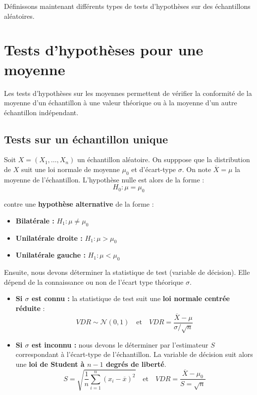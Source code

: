 Définissons maintenant différents types de tests d'hypothèses sur des échantillons aléatoires. 


\section{Tests d'hypothèses pour une moyenne}

Les tests d'hypothèses sur les moyennes permettent de vérifier la conformité de la moyenne d'un échantillon à une 
valeur théorique ou à la moyenne d'un autre échantillon indépendant. 

\subsection{Tests sur un échantillon unique}

Soit $X = (X_1, \dots, X_n)$ un échantillon aléatoire. On supppose que la distribution de $X$ suit une 
loi normale de moyenne $\mu_0$ et d'écart-type $\sigma$. On note $\overline{X} = \mu$ la moyenne de l'échantillon. 
L'hypothèse nulle est alors de la forme : 
    \[ H_0 : \mu = \mu_0 \] 

contre une \textbf{hypothèse alternative} de la forme :
\begin{itemize}
    \item \textbf{Bilatérale :} $H_1 : \mu \not = \mu_0 $ 
    \item \textbf{Unilatérale droite :} $H_1 : \mu > \mu_0 $ 
    \item \textbf{Unilatérale gauche :} $H_1 : \mu < \mu_0 $
\end{itemize}

Ensuite, nous devons déterminer la statistique de test (variable de décision). 
Elle dépend de la connaissance ou non de l'écart type théorique $\sigma$. 
\begin{itemize}
    \item \textbf{Si $\sigma$ est connu :} la statistique de test suit une \textbf{loi normale centrée réduite} :
        \[ VDR \sim \mathcal{N}(0,1) \quad \text{et} \quad VDR = \frac{\overline{X} - \mu}{\sigma / \sqrt{n}}\] 
    \item \textbf{Si $\sigma$ est inconnu :} nous devons le déterminer par l'estimateur $S$ correspondant à l'écart-type 
    de l'échantillon. La variable de décision suit alors une \textbf{loi de Student à $n-1$ degrés de liberté}. 
        \[ S = \sqrt{ \frac{1}{n} \sum_{i=1}^{n} (x_i - \overline{x})^2} \quad \text{et} \quad VDR = \frac{\overline{X} - \mu_0}{S = \sqrt{n}} \] 
\end{itemize}

